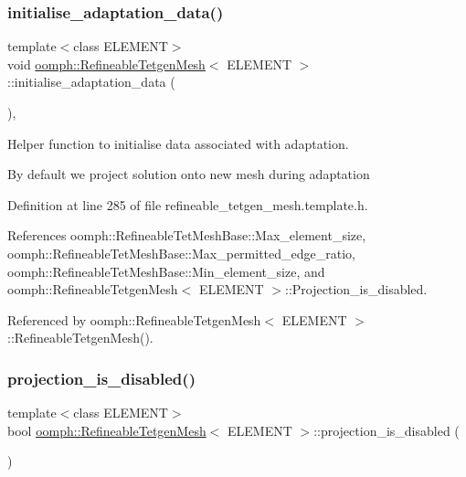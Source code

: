 \subsubsection{\texorpdfstring{initialise\+\_\+adaptation\+\_\+data()}{initialise\_adaptation\_data()}}
{\footnotesize\ttfamily template$<$class E\+L\+E\+M\+E\+NT$>$ \\
void \hyperlink{classoomph_1_1RefineableTetgenMesh}{oomph\+::\+Refineable\+Tetgen\+Mesh}$<$ E\+L\+E\+M\+E\+NT $>$\+::initialise\+\_\+adaptation\+\_\+data (\begin{DoxyParamCaption}{ }\end{DoxyParamCaption})\hspace{0.3cm}{\ttfamily [inline]}, {\ttfamily [protected]}}



Helper function to initialise data associated with adaptation. 

By default we project solution onto new mesh during adaptation 

Definition at line 285 of file refineable\+\_\+tetgen\+\_\+mesh.\+template.\+h.



References oomph\+::\+Refineable\+Tet\+Mesh\+Base\+::\+Max\+\_\+element\+\_\+size, oomph\+::\+Refineable\+Tet\+Mesh\+Base\+::\+Max\+\_\+permitted\+\_\+edge\+\_\+ratio, oomph\+::\+Refineable\+Tet\+Mesh\+Base\+::\+Min\+\_\+element\+\_\+size, and oomph\+::\+Refineable\+Tetgen\+Mesh$<$ E\+L\+E\+M\+E\+N\+T $>$\+::\+Projection\+\_\+is\+\_\+disabled.



Referenced by oomph\+::\+Refineable\+Tetgen\+Mesh$<$ E\+L\+E\+M\+E\+N\+T $>$\+::\+Refineable\+Tetgen\+Mesh().

\mbox{\label{classoomph_1_1RefineableTetgenMesh_a3c2bb21844f02403fa687fefc55ba5ad}} 
\subsubsection{\texorpdfstring{projection\+\_\+is\+\_\+disabled()}{projection\_is\_disabled()}}
{\footnotesize\ttfamily template$<$class E\+L\+E\+M\+E\+NT$>$ \\
bool \hyperlink{classoomph_1_1RefineableTetgenMesh}{oomph\+::\+Refineable\+Tetgen\+Mesh}$<$ E\+L\+E\+M\+E\+NT $>$\+::projection\+\_\+is\+\_\+disabled (\begin{DoxyParamCaption}{ }\end{DoxyParamCaption})\hspace{0.3cm}{\ttfamily [inline]}}



